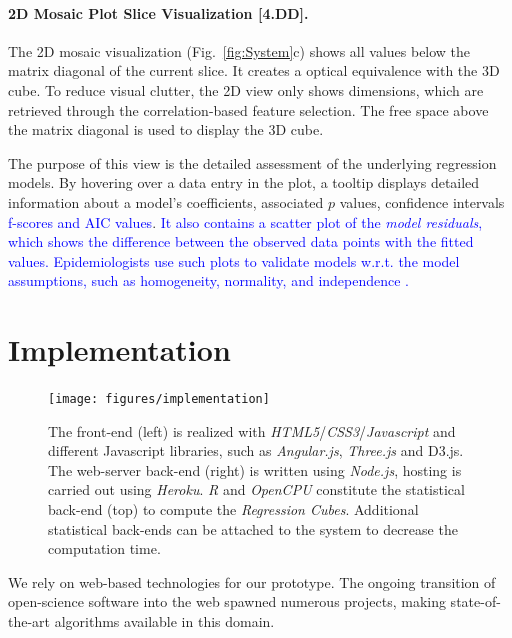 \documentclass[journal]{style/vgtc} 			          %
\newcommand{\add}[1]{\textcolor{blue}{#1}}
\begin{document}
\paragraph{2D Mosaic Plot Slice Visualization [4.DD].}
The 2D mosaic visualization (Fig.~\ref{fig:System}c) shows all values below the matrix diagonal of the current slice.
It creates a optical equivalence with the 3D cube.
To reduce visual clutter, the 2D view only shows dimensions, which are retrieved through the correlation-based feature selection.
The free space above the matrix diagonal is used to display the 3D cube.

The purpose of this view is the detailed assessment of the underlying regression models.
By hovering over a data entry in the plot, a tooltip displays detailed information about a model's coefficients, associated $p$ values, confidence intervals \add{f-scores and AIC values}.
\add{
It also contains a scatter plot of the \emph{model residuals}, which shows the difference between the observed data points with the fitted values.
Epidemiologists use such plots to validate models w.r.t. the model assumptions, such as homogeneity, normality, and independence \cite{GraphicModelAssessment}.
}

\section{Implementation} \label{implementation}
\begin{figure}[htb]
 \centering
 \texttt{[image: figures/implementation]}
 \caption{
 The front-end (left) is realized with \emph{HTML5}/\emph{CSS3}/\emph{Javascript} and different Javascript libraries, such as \emph{Angular.js}, \emph{Three.js} and D3.js.
 The web-server back-end (right) is written using \emph{Node.js}, hosting is carried out using \emph{Heroku}.
 \emph{R} and \emph{OpenCPU} constitute the statistical back-end (top) to compute the \emph{Regression Cubes}.
 Additional statistical back-ends can be attached to the system to decrease the computation time.
 }
  \label{fig:Implementation}
\end{figure}
We rely on web-based technologies for our prototype.
The ongoing transition of open-science software into the web spawned numerous projects, making state-of-the-art algorithms available in this domain.
\end{document}
